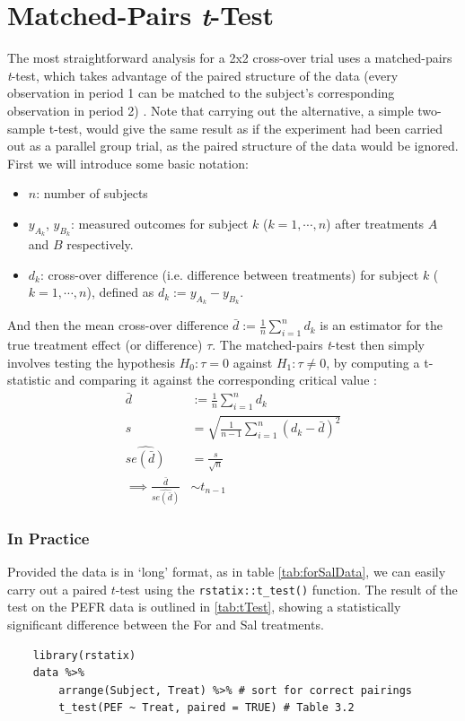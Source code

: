 \documentclass[12pt, TexShade, letterpaper]{report}
\begin{document}
\section{Matched-Pairs \textit{t}-Test}
The most straightforward analysis for a 2x2 cross-over trial uses a matched-pairs \textit{t}-test, which takes advantage of the paired structure of the data (every observation in period 1 can be matched to the subject's corresponding observation in period 2) \cite{senn2002crossover}. Note that carrying out the alternative, a simple two-sample t-test, would give the same result as if the experiment had been carried out as a parallel group trial, as the paired structure of the data would be ignored. First we will introduce some basic notation:
\begin{itemize}
    \item $n$: number of subjects
    \item $y_{A_k}$, $y_{B_k}$: measured outcomes for subject $k$ ($k=1,\cdots,n$) after treatments $A$ and $B$ respectively.
    \item $d_k$: cross-over difference (i.e. difference between treatments) for subject $k$ ($k=1,\cdots,n$), defined as $d_k := y_{A_k}-y_{B_k}$.
\end{itemize}
And then the mean cross-over difference $\bar{d} := \frac{1}{n}\sum_{i=1}^{n}d_k$ is an estimator for the true treatment effect (or difference) $\tau$. The matched-pairs \textit{t}-test then simply involves testing the hypothesis $H_0: \tau = 0$ against $H_1: \tau \neq 0$, by computing a t-statistic and comparing it against the corresponding critical value \cite{senn2002crossover}:
\begin{align*}
    \bar{d} &:= \frac{1}{n}\sum_{i=1}^{n}d_k \\
    s &= \sqrt{\frac{1}{n-1}\sum_{i=1}^{n}(d_k-\bar{d})^2} \\
    \widehat{se(\bar{d})} &= \frac{s}{\sqrt{n}} \\
    \implies \frac{\bar{d}}{\widehat{se(\bar{d})}} &\sim t_{n-1}
\end{align*}

\subsubsection{In Practice}
Provided the data is in `long' format, as in table \ref{tab:forSalData}, we can easily carry out a paired $t$-test using the \texttt{rstatix::t_test()} function. The result of the test on the PEFR data is outlined in \ref{tab:tTest}, showing a statistically significant difference between the For and Sal treatments.
\begin{verbatim}
    library(rstatix)
    data %>%
        arrange(Subject, Treat) %>% # sort for correct pairings
        t_test(PEF ~ Treat, paired = TRUE) # Table 3.2
\end{verbatim}

\end{document}
